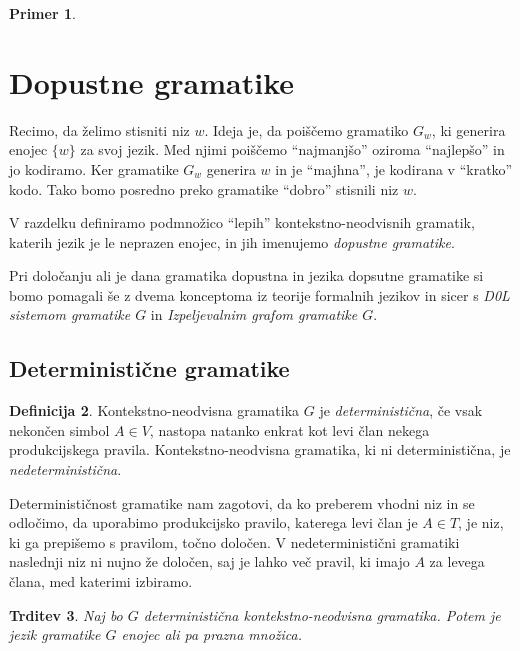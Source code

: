 \documentclass{amsart}
\theoremstyle{definition}
\newtheorem{definicija}{Definicija}[section]
\newtheorem{primer}[definicija]{Primer}
\theoremstyle{plain} %
\newtheorem{trditev}[definicija]{Trditev}
\begin{document}
\begin{primer}
    
\end{primer}

\section{Dopustne gramatike}

Recimo, da želimo stisniti niz $ w $. Ideja je, da poiščemo gramatiko $ G_w $, ki generira
enojec $ \{ w \} $ za svoj jezik. Med njimi poiščemo ``najmanjšo'' oziroma ``najlepšo'' in jo kodiramo.
Ker gramatike $ G_w $ generira $ w $ in je ``majhna'', je kodirana v ``kratko'' kodo.
Tako bomo posredno preko gramatike ``dobro'' stisnili niz $ w $.

V razdelku definiramo podmnožico ``lepih'' kontekstno-neodvisnih gramatik, katerih jezik je le
neprazen enojec, in jih imenujemo \textit{dopustne gramatike}.

Pri določanju ali je dana gramatika dopustna in jezika dopsutne gramatike si bomo pomagali še z dvema konceptoma iz
teorije formalnih jezikov in sicer s \textit{D0L sistemom gramatike $G$} in \textit{Izpeljevalnim grafom gramatike $G$}.


\subsection{Deterministične gramatike}

\begin{definicija}
    
    Kontekstno-neodvisna gramatika $G$ je \textit{deterministična}, če vsak nekončen simbol $ A \in V $,
    nastopa natanko enkrat kot levi član nekega produkcijskega pravila.
    Kontekstno-neodvisna gramatika, ki ni deterministična, je \textit{nedeterministična}.

\end{definicija}

Determinističnost gramatike nam zagotovi, da ko preberem vhodni niz in se odločimo, da uporabimo produkcijsko 
pravilo, katerega levi član je $ A \in T $, je niz, ki ga prepišemo s pravilom, točno določen.
V nedeterministični gramatiki naslednji niz ni nujno že določen, saj je lahko več pravil, ki imajo $ A $ za levega člana, med 
katerimi izbiramo.

\begin{trditev}

    Naj bo $G$ deterministična kontekstno-neodvisna gramatika. Potem je jezik gramatike $G$ enojec ali pa prazna množica.

\end{trditev}
\end{document}
